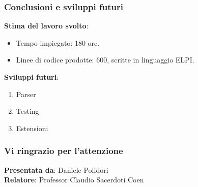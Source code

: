 \documentclass{beamer}
\begin{document}
\begin{frame}

 \frametitle{Conclusioni e sviluppi futuri}

 \textbf{Stima del lavoro svolto}:
 \begin{itemize}
  \item Tempo impiegato: 180 ore.
  \item Linee di codice prodotte: 600, scritte in linguaggio ELPI.
 \end{itemize}

 \vfill

 \textbf{Sviluppi futuri}:
 \begin{enumerate}
  \item Parser
  \item Testing
  \item Estensioni
 \end{enumerate}

\end{frame}


\begin{frame}

 \frametitle{Vi ringrazio per l'attenzione}

 \vfill

 \begin{flushright}
  \textbf{Presentata da}: Daniele Polidori\\
  \textbf{Relatore}: Professor Claudio Sacerdoti Coen
 \end{flushright}

\end{frame}
\end{document}
